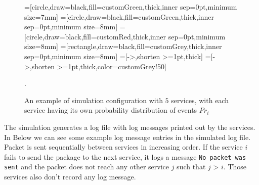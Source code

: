 \begin{figure}\centering
	=[circle,draw=black,fill=customGreen,thick,inner sep=0pt,minimum size=7mm]
		=[circle,draw=black,fill=customGreen,thick,inner sep=0pt,minimum size=8mm]
		=[circle,draw=black,fill=customRed,thick,inner sep=0pt,minimum size=8mm]
		=[rectangle,draw=black,fill=customGrey,thick,inner sep=0pt,minimum size=8mm]
		=[->,shorten >=1pt,thick]
		=[->,shorten >=1pt,thick,color=customGrey!50]

	\caption{An example of simulation configuration with $5$ services, with each service having its own probability distribution of events $Pr_i$}.
	\label{figure:simulation}
\end{figure}

The simulation generates a log file with log messages printed out by the services. In Below we can see some example log message entries in the simulated log file. Packet is sent sequentially between services in increasing order. If the service $i$ fails to send the package to the next service, it logs a message \texttt{No packet was sent} and the packet does not reach any other service $j$ such that $j$ > $i$. Those services also don't record any log message. 


